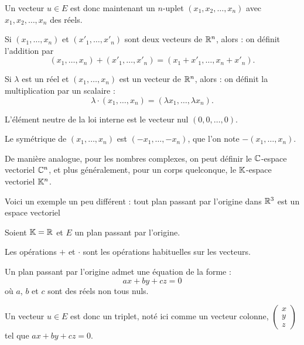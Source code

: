 Un vecteur $u\in E$ est donc maintenant un $n$-uplet 
   $(x_1,x_2, \ldots , x_n)$ avec $x_1,x_2, \ldots , x_n$ des réels.

\change

  Si $(x_1, \dots , x_n)$ et $(x'_1, \dots , x'_n)$ sont deux vecteurs de $\mathbb{R}^n$, alors :
  on définit l'addition par 
  $$(x_1, \dots , x_n)+(x'_1, \dots , x'_n)=
  (x_1+x'_1, \dots , x_n+x'_n).$$    
  
\change

      Si $\lambda$ est un réel et $(x_1, \dots , x_n)$ est un vecteur de $\mathbb{R}^n$, alors :
      on définit la multiplication par un scalaire :
  $$\lambda \cdot (x_1, \dots , x_n)=(\lambda x_1,\dots ,  \lambda x_n).$$

 \change

L'élément neutre de la loi interne est le vecteur nul $(0,0, \dots, 0)$. 

\change

Le symétrique de  $(x_1, \dots , x_n)$ est $(-x_1, \dots , -x_n)$, que l'on note 
$-(x_1, \dots , x_n)$.
  
De manière analogue, pour les nombres complexes, on peut définir le $\mathbb{C}$-espace vectoriel $\mathbb{C}^n$,  
et plus généralement, pour un corps quelconque, le $\mathbb{K}$-espace vectoriel $\mathbb{K}^n$.



\diapo

Voici un exemple un peu différent : tout plan passant par l'origine dans $\mathbb{R}^3$ est un espace vectoriel 

\change

Soient $\mathbb{K}=\mathbb{R}$ et $E$ un plan passant par l'origine. 

Les opérations $+$ et $\cdot$ sont les opérations habituelles sur les vecteurs. 

\change

Un plan passant par l'origine admet une équation de la forme :
$$ax + by + cz = 0$$
où $a$, $b$ et $c$ sont des réels non tous nuls.  



\change

Un vecteur $u\in E$ est donc un triplet, noté ici comme un vecteur colonne,
$\left(\begin{smallmatrix}x\\ y\\ z\end{smallmatrix}\right)$ tel que
$ax + by + cz = 0$.

